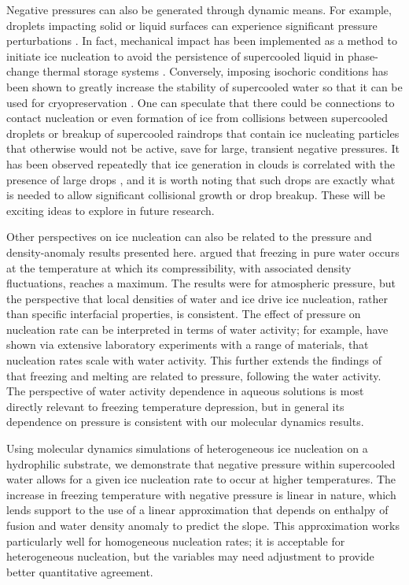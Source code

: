 \documentclass[journal abbreviation, manuscript]{copernicus}
\begin{document}
Negative pressures can also be generated through dynamic means. For example, droplets impacting solid or liquid surfaces can experience significant pressure perturbations \citep{cheng2022drop}. In fact, mechanical impact has been implemented as a method to initiate ice nucleation to avoid the persistence of supercooled liquid in phase-change thermal storage systems \citep{wang2022nucleation}. Conversely, imposing isochoric conditions has been shown to greatly increase the stability of supercooled water so that it can be used for cryopreservation \citep{powell2020isochoric}. One can speculate that there could be connections to contact nucleation or even formation of ice from collisions between supercooled droplets \citep{alkezweeny1969freezing} or breakup of supercooled raindrops that contain ice nucleating particles that otherwise would not be active, save for large, transient negative pressures. It has been observed repeatedly that ice generation in clouds is correlated with the presence of large drops \citep{rangno1991ice,lance2011cloud}, and it is worth noting that such drops are exactly what is needed to allow significant collisional growth or drop breakup. These will be exciting ideas to explore in future research.

Other perspectives on ice nucleation can also be related to the pressure and density-anomaly results presented here. \citet{baker2004new} argued that freezing in pure water occurs at the temperature at which its compressibility, with associated density fluctuations, reaches a maximum. The results were for atmospheric pressure, but the perspective that local densities of water and ice drive ice nucleation, rather than specific interfacial properties, is consistent. The effect of pressure on nucleation rate can be interpreted in terms of water activity; for example, \citep{knopf2013water} have shown via extensive laboratory experiments with a range of materials, that nucleation rates scale with water activity. This further extends the findings of \citet{koop2000water} that freezing and melting are related to pressure, following the water activity. The perspective of water activity dependence in aqueous solutions is most directly relevant to freezing temperature depression, but in general its dependence on pressure is consistent with our molecular dynamics results. 


Using molecular dynamics simulations of heterogeneous ice nucleation on a hydrophilic substrate, we demonstrate that negative pressure within supercooled water allows for a given ice nucleation rate to occur at higher temperatures. The increase in freezing temperature with negative pressure is linear in nature, which lends support to the use of a linear approximation that depends on enthalpy of fusion and water density anomaly to predict the slope.  This approximation works particularly well for homogeneous nucleation rates; it is acceptable for heterogeneous nucleation, but the variables may need adjustment to provide better quantitative agreement. 
\end{document}
